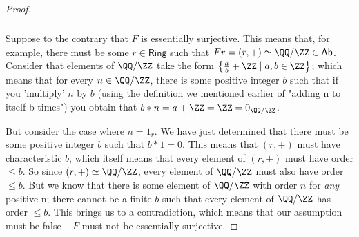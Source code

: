 \documentclass[main.tex]{subfiles}
\begin{document}
\begin{proof}

	\subparagraph{}
	Suppose to the contrary that \(F\) is essentially surjective. This means
	that, for example, there must be some \(r \in \textsf{Ring}\) such that \(Fr
	= (r, +) \simeq \QQ/\ZZ \in \textsf{Ab}\). Consider that elements of
	\(\QQ/\ZZ\) take the form \(\left\{\frac{a}{b} + \ZZ \mid a, b \in
	\ZZ\right\}\); which means that for every \(n \in \QQ/\ZZ\), there is some
	positive integer \(b\) such that if you 'multiply' \(n\) by \(b\) (using the
	definition we mentioned earlier of "adding n to itself b times") you obtain
	that \(b*n = a + \ZZ = \ZZ = 0_{\QQ/\ZZ}\).

	But consider the case where \(n = 1_r\). We have just determined that there
	must be some positive integer \(b\) such that \(b*1 = 0\). This means that
	\((r, +)\) must have characteristic \(b\), which itself means that every
	element of \((r, +)\) must have order \(\leq b\). So since \((r, +) \simeq
	\QQ/\ZZ\), every element of \(\QQ/\ZZ\) must also have order \(\leq b\). But
	we know that there is some element of \(\QQ/\ZZ\) with order \(n\) for
	\textit{any} positive n; there cannot be a finite \(b\) such that every
	element of \(\QQ/\ZZ\) has order \(\leq b\). This brings us to a
	contradiction, which means that our assumption must be false -- \(F\) must
	not be essentially surjective.
\end{proof}
\end{document}
